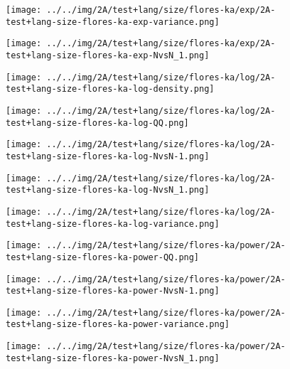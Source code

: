 \begin{figure}[H]
\centering	\texttt{[image: ../../img/2A/test+lang/size/flores-ka/exp/2A-test+lang-size-flores-ka-exp-variance.png]}
\end{figure}
\begin{figure}[H]
\centering	\texttt{[image: ../../img/2A/test+lang/size/flores-ka/exp/2A-test+lang-size-flores-ka-exp-NvsN\_1.png]}
\end{figure}
\begin{figure}[H]
\centering	\texttt{[image: ../../img/2A/test+lang/size/flores-ka/log/2A-test+lang-size-flores-ka-log-density.png]}
\end{figure}
\begin{figure}[H]
\centering	\texttt{[image: ../../img/2A/test+lang/size/flores-ka/log/2A-test+lang-size-flores-ka-log-QQ.png]}
\end{figure}
\begin{figure}[H]
\centering	\texttt{[image: ../../img/2A/test+lang/size/flores-ka/log/2A-test+lang-size-flores-ka-log-NvsN-1.png]}
\end{figure}
\begin{figure}[H]
\centering	\texttt{[image: ../../img/2A/test+lang/size/flores-ka/log/2A-test+lang-size-flores-ka-log-NvsN\_1.png]}
\end{figure}
\begin{figure}[H]
\centering	\texttt{[image: ../../img/2A/test+lang/size/flores-ka/log/2A-test+lang-size-flores-ka-log-variance.png]}
\end{figure}
\begin{figure}[H]
\centering	\texttt{[image: ../../img/2A/test+lang/size/flores-ka/power/2A-test+lang-size-flores-ka-power-QQ.png]}
\end{figure}
\begin{figure}[H]
\centering	\texttt{[image: ../../img/2A/test+lang/size/flores-ka/power/2A-test+lang-size-flores-ka-power-NvsN-1.png]}
\end{figure}
\begin{figure}[H]
\centering	\texttt{[image: ../../img/2A/test+lang/size/flores-ka/power/2A-test+lang-size-flores-ka-power-variance.png]}
\end{figure}
\begin{figure}[H]
\centering	\texttt{[image: ../../img/2A/test+lang/size/flores-ka/power/2A-test+lang-size-flores-ka-power-NvsN\_1.png]}
\end{figure}
